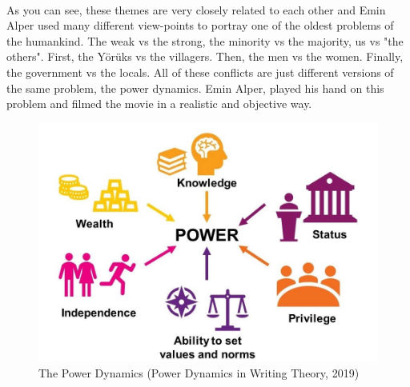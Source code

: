 \documentclass[12pt]{article}
\begin{document}
\\
As you can see, these themes are very closely related to each other and Emin Alper used many different view-points to portray one of the oldest problems of the humankind. The weak vs the strong, the minority vs the majority, us vs "the others". First, the Yörüks vs the villagers. Then, the men vs the women. Finally, the government vs the locals. All of these conflicts are just different versions of the same problem, the power dynamics. Emin Alper, played his hand on this problem and filmed the movie in a realistic and objective way.

\begin{figure}[h]
        \begin{center}
                \includegraphics[width=120mm,scale=0.5]{power}
                \caption{The Power Dynamics (Power Dynamics in Writing Theory, 2019)}
        \end{center}
\end{figure}

\FloatBarrier
\end{document}
